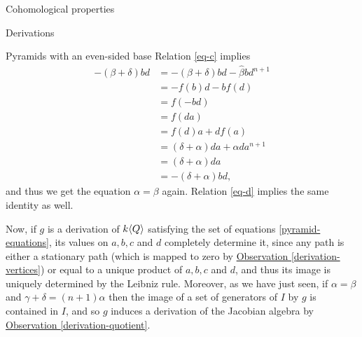 \begin{chapter}{Cohomological properties}
\begin{section}{Derivations}
\begin{subsection}{Pyramids with an even-sided base}
Relation \eqref{eq-c} implies
\begin{align*}-(\beta+\delta)bd &=-(\beta+\delta)bd - \hat\beta bd^{n+1}\\
&=-f(b)d - bf(d)\\
&=f(-bd)\\
&=f(da)\\
&=f(d)a+df(a)\\
&=(\delta+\alpha)da + \hat\alpha da^{n+1}\\
&=(\delta+\alpha)da\\
&=-(\delta+\alpha)bd,
\end{align*}
and thus we get the equation $\alpha=\beta$ again. Relation \eqref{eq-d} implies the same identity as well.

Now, if $g$ is a derivation of $k\langle Q\rangle$ satisfying the set of equations \eqref{pyramid-equations}, its values on $a,b,c$ and $d$ completely determine it, since any path is either a stationary path (which is mapped to zero by \hyperref[derivation-vertices]{Observation \ref*{derivation-vertices}}) or equal to a unique product of $a,b,c$ and $d$, and thus its image is uniquely determined by the Leibniz rule. Moreover, as we have just seen, if $\alpha=\beta$ and $\gamma+\delta=(n+1)\alpha$ then the image of a set of generators of $I$ by $g$ is contained in $I$, and so $g$ induces a derivation of the Jacobian algebra  by \hyperref[derivation-quotient]{Observation \ref*{derivation-quotient}}.


\end{subsection}
\end{section}
\end{chapter}
